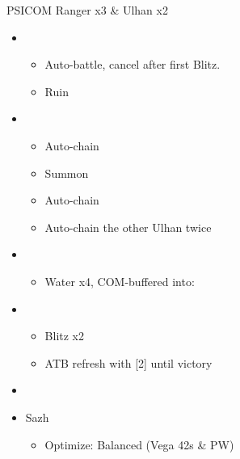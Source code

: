 \begin{paracol}{2}
	\begin{battle}{PSICOM Ranger x3 \& Ulhan x2}
		\begin{itemize}
			\item \second
			      \begin{itemize}
				      \item Auto-battle, cancel after first Blitz.
				      \item Ruin
			      \end{itemize}
			\item \fourth
			      \begin{itemize}
				      \item Auto-chain
				      \item Summon
				      \item Auto-chain
			      \end{itemize}
			      \begin{itemize}
				      \item Auto-chain the other Ulhan twice
			      \end{itemize}
			\item \fourth
			      \begin{itemize}
				      \item Water x4, COM-buffered into:
			      \end{itemize}
			\item \first
			      \begin{itemize}
				      \item Blitz x2
				      \item ATB refresh with [2] until victory
			      \end{itemize}
		\end{itemize}
		 
	\end{battle}
	\switchcolumn*

	\begin{menu}
		\begin{itemize}
			\paradigm
			\begin{itemize}
				\item {}%
				      {\paradigmline{\com}{\rav}{}}%
				      {\paradigmline[2]{\textit{\syn}}{\textit{\sab}}{}}%
				      {\paradigmline{\com}{(\sab)}{}}%
				      {\paradigmline{\rav}{\rav}{}}
			\end{itemize}
			\equip
			\begin{itemize}
				\item Sazh
				      \begin{itemize}
					      \item Optimize: Balanced (Vega 42s \& PW)
				      \end{itemize}
			\end{itemize}
		\end{itemize}
	\end{menu}


\end{paracol}
